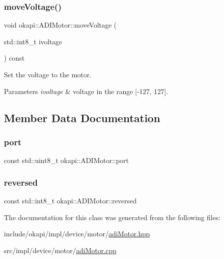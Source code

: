 \subsubsection{\texorpdfstring{moveVoltage()}{moveVoltage()}}
{\footnotesize\ttfamily void okapi\+::\+A\+D\+I\+Motor\+::move\+Voltage (\begin{DoxyParamCaption}\item[{std\+::int8\+\_\+t}]{ivoltage }\end{DoxyParamCaption}) const\hspace{0.3cm}{\ttfamily [virtual]}}

Set the voltage to the motor.


\begin{DoxyParams}{Parameters}
{\em ivoltage} & voltage in the range \mbox{[}-\/127, 127\mbox{]}. \\
\hline
\end{DoxyParams}


\subsection{Member Data Documentation}
\mbox{\label{classokapi_1_1ADIMotor_aae748af2c07c58821db34dff7924f4b7}} 
\subsubsection{\texorpdfstring{port}{port}}
{\footnotesize\ttfamily const std\+::uint8\+\_\+t okapi\+::\+A\+D\+I\+Motor\+::port\hspace{0.3cm}{\ttfamily [protected]}}

\mbox{\label{classokapi_1_1ADIMotor_a3abbe2875ba0abb35297d8dbe91cd4f4}} 
\subsubsection{\texorpdfstring{reversed}{reversed}}
{\footnotesize\ttfamily const std\+::int8\+\_\+t okapi\+::\+A\+D\+I\+Motor\+::reversed\hspace{0.3cm}{\ttfamily [protected]}}



The documentation for this class was generated from the following files\+:\begin{DoxyCompactItemize}
\item 
include/okapi/impl/device/motor/\mbox{\hyperlink{adiMotor_8hpp}{adi\+Motor.\+hpp}}\item 
src/impl/device/motor/\mbox{\hyperlink{adiMotor_8cpp}{adi\+Motor.\+cpp}}\end{DoxyCompactItemize}
